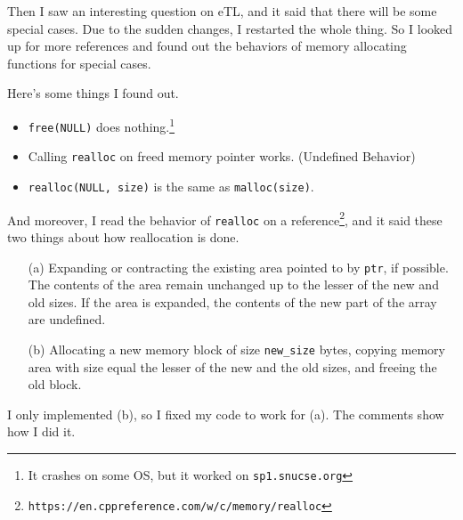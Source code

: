 \documentclass[12pt]{report}
\begin{document}
Then I saw an interesting question on eTL, and it said that there will be some special cases. Due to the sudden changes, I restarted the whole thing. So I looked up for more references and found out the behaviors of memory allocating functions for special cases.

Here's some things I found out.
\begin{itemize}
	\item \texttt{free(NULL)} does nothing.\footnote{It crashes on some OS, but it worked on \texttt{sp1.snucse.org}}
	\item Calling \texttt{realloc} on freed memory pointer works. (Undefined Behavior)
	\item \texttt{realloc(NULL, size)} is the same as \texttt{malloc(size)}.
\end{itemize}
And moreover, I read the behavior of \texttt{realloc} on a reference\footnote{\texttt{https://en.cppreference.com/w/c/memory/realloc}}, and it said these two things about how reallocation is done.
\begin{itemize}
	\item[(a)] Expanding or contracting the existing area pointed to by \texttt{ptr}, if possible. The contents of the area remain unchanged up to the lesser of the new and old sizes. If the area is expanded, the contents of the new part of the array are undefined.
	\item[(b)] Allocating a new memory block of size \texttt{new\_size} bytes, copying memory area with size equal the lesser of the new and the old sizes, and freeing the old block.
\end{itemize}
I only implemented (b), so I fixed my code to work for (a). The comments show how I did it.
\end{document}
